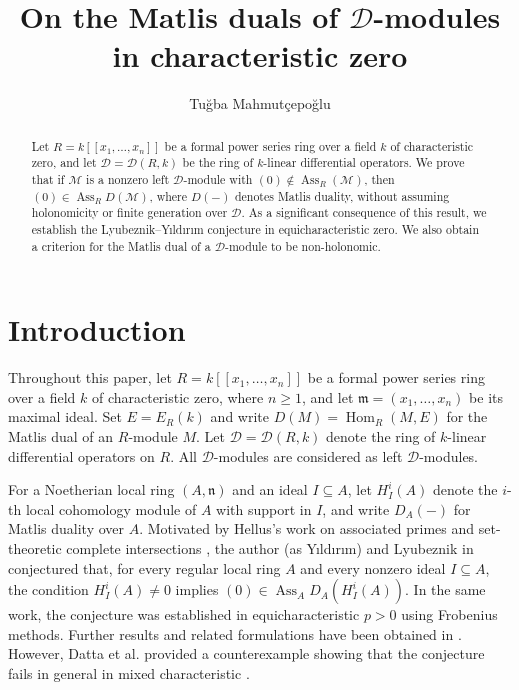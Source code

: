 \documentclass[11pt]{amsart}
\title{On the Matlis duals of $\mathcal D$-modules in characteristic zero}
\author{Tu\u gba Mahmut\c cepo\u glu}
\theoremstyle{definition}
\newcommand{\m}{\mathfrak m}
\newcommand{\D}{\mathcal D}
\newcommand{\M}{\mathcal M}
\DeclareMathOperator{\Ass}{Ass}
\DeclareMathOperator{\Hom}{Hom}
\begin{document}
\begin{abstract}
Let $R=k[[x_1,\ldots,x_n]]$ be a formal power series ring over a field $k$ of characteristic zero, and let $\D=\D(R,k)$ be the ring of $k$-linear differential operators. We prove that if $\M$ is a nonzero left $\D$-module with $(0)\notin\Ass_R(\M)$, then
$(0)\in\Ass_R D(\M)$, where $D(-)$ denotes Matlis duality, without assuming holonomicity or finite generation over $\D$. As a significant consequence of this result, we establish the Lyubeznik--Y{\i}ld{\i}r{\i}m conjecture in equicharacteristic zero. We also obtain a criterion for the Matlis dual of a $\D$-module to be non-holonomic.
\end{abstract}
\maketitle
\section{Introduction}
Throughout this paper, let $R=k[[x_1,\ldots,x_n]]$ be a formal power series ring over a field $k$ of characteristic zero, where $n\geq 1$, and let $\m=(x_1,\ldots,x_n)$ be its maximal ideal. Set $E=E_R(k)$ and write $D(M)=\Hom_R(M,E)$ for the Matlis dual of an $R$-module $M$. Let $\D=\D(R,k)$ denote the ring of $k$-linear differential operators on $R$. All $\D$-modules are considered as left $\D$-modules.

\par

For a Noetherian local ring $(A,\mathfrak n)$ and an ideal $I\subseteq A$, let $H_I^i(A)$ denote the $i$-th local cohomology module of $A$ with support in $I$, and write $D_A(-)$ for Matlis
duality over $A$. Motivated by Hellus's work on associated primes and set-theoretic complete intersections \cite{Hel07}, the author (as Y\i ld\i r\i m) and Lyubeznik in  \cite{LY} conjectured that, for every regular local ring $A$ and every nonzero ideal $I\subseteq A$, the condition $H_I^i(A)\neq 0$ implies $(0)\in\Ass_A D_A(H_I^i(A))$. In the same work, the conjecture was established in equicharacteristic $p>0$ using Frobenius methods. Further results and related formulations have been obtained in \cite{BE, Zha23}.  However, Datta et al. provided a counterexample showing that the conjecture fails in general in mixed characteristic \cite[Remark 4.7]{DSZ23}. 
\end{document}
